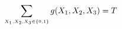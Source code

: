 \documentclass[preview]{standalone}
\begin{document}
\begin{align*}
\special{dvisvgm:raw <g id='unique000'>}\sum_{\scriptscriptstyle X_1, X_2, X_3 \in \{0,1\}} g(X_1, X_2, X_3) = T\special{dvisvgm:raw </g>}
\end{align*}
\end{document}
